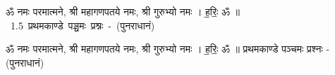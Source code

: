 \documentclass[17pt]{extarticle}
\begin{document}
\begin{titlepage}
    \begin{center}
 
\begin{sanskrit}
    { \Large
    ॐ नमः परमात्मने, श्री महागणपतये नमः, 
श्री गुरुभ्यो नमः । ह॒रिः॒ ॐ ॥ 
    }
    \\
    \vspace{2.5cm}
    \mbox{ \Huge
    1.5     प्रथमकाण्डे पञ्चमः प्रश्नः - (पुनराधानं)   }
\end{sanskrit}
\end{center}

\end{titlepage}
\tableofcontents

ॐ नमः परमात्मने, श्री महागणपतये नमः, 
श्री गुरुभ्यो नमः । ह॒रिः॒ ॐ ॥      प्रथमकाण्डे पञ्चमः प्रश्नः - (पुनराधानं) \newline

\end{document}
